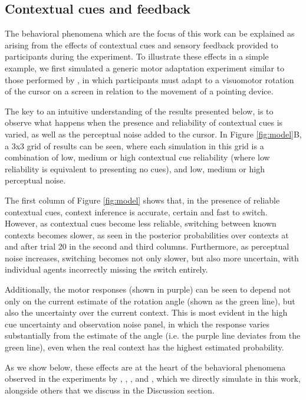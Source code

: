 \documentclass[a4paper,doc,floatsintext,natbib]{apa6}
\def \fref #1{Figure \ref{#1}}     %
\begin{document}
\subsection{Contextual cues and feedback}
The behavioral phenomena which are the focus of this work can be explained as arising from the effects of contextual cues and sensory feedback provided to participants during the experiment. To illustrate these effects in a simple example, we first simulated a generic motor adaptation experiment similar to those performed by \cite{Davidson_Scaling_2004}, in which participants must adapt to a visuomotor rotation of the cursor on a screen in relation to the movement of a pointing device.

The key to an intuitive understanding of the results presented below, is to observe what happens when the presence and reliability of contextual cues is varied, as well as the perceptual noise added to the cursor. In \fref{fig:model}B, a 3x3 grid of results can be seen, where each simulation in this grid is a combination of low, medium or high contextual cue reliability (where low reliability is equivalent to presenting no cues), and low, medium or high perceptual noise.

The first column of \fref{fig:model} shows that, in the presence of reliable contextual cues, context inference is accurate, certain and fast to switch. However, as contextual cues become less reliable, switching between known contexts becomes slower, as seen in the posterior probabilities over contexts at and after trial 20 in the second and third columns. Furthermore, as perceptual noise increases, switching becomes not only slower, but also more uncertain, with individual agents incorrectly missing the switch entirely.

Additionally, the motor responses (shown in purple) can be seen to depend not only on the current estimate of the rotation angle (shown as the green line), but also the uncertainty over the current context. This is most evident in the high cue uncertainty and observation noise panel, in which the response varies substantially from the estimate of the angle (i.e. the purple line deviates from the green line), even when the real context has the highest estimated probability.

As we show below, these effects are at the heart of the behavioral phenomena observed in the experiments by \cite{Kim_Neural_2015}, \cite{Oh_Minimizing_2019}, \cite{Davidson_Scaling_2004}, and \cite{Vaswani_Decay_2013}, which we directly simulate in this work, alongside others that we discuss in the Discussion section.
\end{document}
